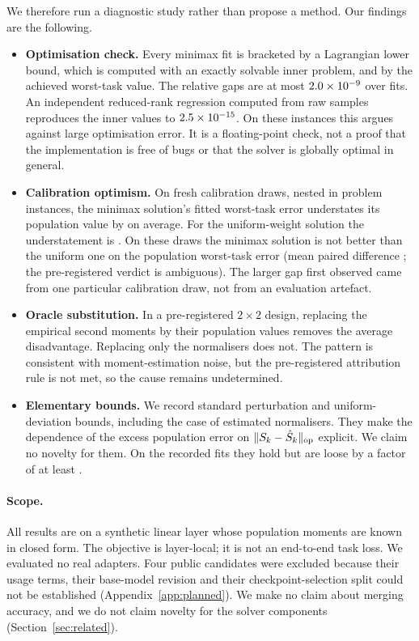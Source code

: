 We therefore run a diagnostic study rather than propose a method. Our findings are the following.
\begin{itemize}
\item \textbf{Optimisation check.} Every minimax fit is bracketed by a Lagrangian lower bound, which
is computed with an exactly solvable inner problem, and by the achieved worst-task value. The
relative gaps are at most $2.0\times10^{-9}$ over \STwoNFits{} fits. An independent reduced-rank
regression computed from raw samples reproduces the inner values to $2.5\times10^{-15}$. On these
instances this argues against large optimisation error. It is a floating-point check, not a proof
that the implementation is free of bugs or that the solver is globally optimal in general.
\item \textbf{Calibration optimism.} On \CfgNewCells{} fresh calibration draws, nested in
\CfgNTeachers{} problem instances, the minimax solution's fitted worst-task error understates its
population value by \STwoOptGapEEMinimax{} on average. For the uniform-weight solution the
understatement is \STwoOptGapEEUniform. On these draws the minimax solution is not better than
the uniform one on the population worst-task error (mean paired difference \STwoDeltaEE; the
pre-registered verdict is ambiguous). The larger gap first observed came from one particular
calibration draw, not from an evaluation artefact.
\item \textbf{Oracle substitution.} In a pre-registered $2\times2$ design, replacing the
empirical second moments by their population values removes the average disadvantage.
Replacing only the normalisers does not. The pattern is consistent with moment-estimation noise,
but the pre-registered attribution rule is not met, so the cause remains undetermined.
\item \textbf{Elementary bounds.} We record standard perturbation and uniform-deviation bounds,
including the case of estimated normalisers. They make the dependence of the excess population
error on $\lVert S_k-\hat{S}_k\rVert_{\mathrm{op}}$ explicit. We claim no novelty for them. On the recorded fits they
hold but are loose by a factor of at least \SThreeMinBoundOverExcess.
\end{itemize}

\paragraph{Scope.} All results are on a synthetic linear layer whose population moments are known
in closed form. The objective is layer-local; it is not an end-to-end task loss. We evaluated no
real adapters. Four public candidates were excluded because their usage terms, their base-model
revision and their checkpoint-selection split could not be established
(Appendix~\ref{app:planned}). We make no claim about merging accuracy, and we do not claim novelty
for the solver components (Section~\ref{sec:related}).
